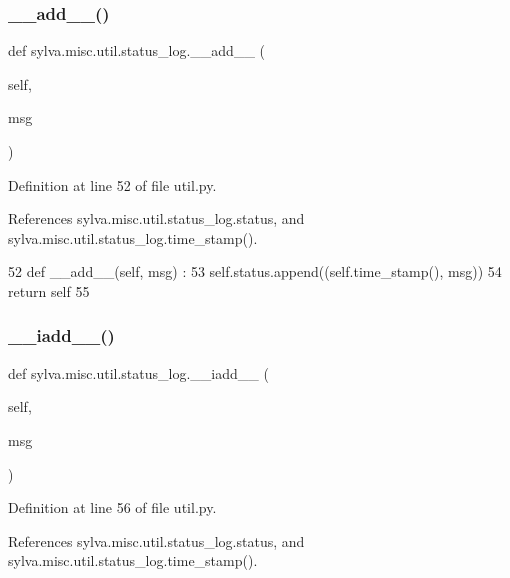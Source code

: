 \subsubsection{\texorpdfstring{\+\_\+\+\_\+add\+\_\+\+\_\+()}{\_\_add\_\_()}}
{\footnotesize\ttfamily def sylva.\+misc.\+util.\+status\+\_\+log.\+\_\+\+\_\+add\+\_\+\+\_\+ (\begin{DoxyParamCaption}\item[{}]{self,  }\item[{}]{msg }\end{DoxyParamCaption})}



Definition at line 52 of file util.\+py.



References sylva.\+misc.\+util.\+status\+\_\+log.\+status, and sylva.\+misc.\+util.\+status\+\_\+log.\+time\+\_\+stamp().


\begin{DoxyCode}
52   \textcolor{keyword}{def }\_\_add\_\_(self, msg) :
53     self.status.append((self.time\_stamp(), msg))
54     \textcolor{keywordflow}{return} self
55 
\end{DoxyCode}
\mbox{\label{classsylva_1_1misc_1_1util_1_1status__log_ab13cd7b4f04bc397105042ebfb34cfaa}} 
\subsubsection{\texorpdfstring{\+\_\+\+\_\+iadd\+\_\+\+\_\+()}{\_\_iadd\_\_()}}
{\footnotesize\ttfamily def sylva.\+misc.\+util.\+status\+\_\+log.\+\_\+\+\_\+iadd\+\_\+\+\_\+ (\begin{DoxyParamCaption}\item[{}]{self,  }\item[{}]{msg }\end{DoxyParamCaption})}



Definition at line 56 of file util.\+py.



References sylva.\+misc.\+util.\+status\+\_\+log.\+status, and sylva.\+misc.\+util.\+status\+\_\+log.\+time\+\_\+stamp().


